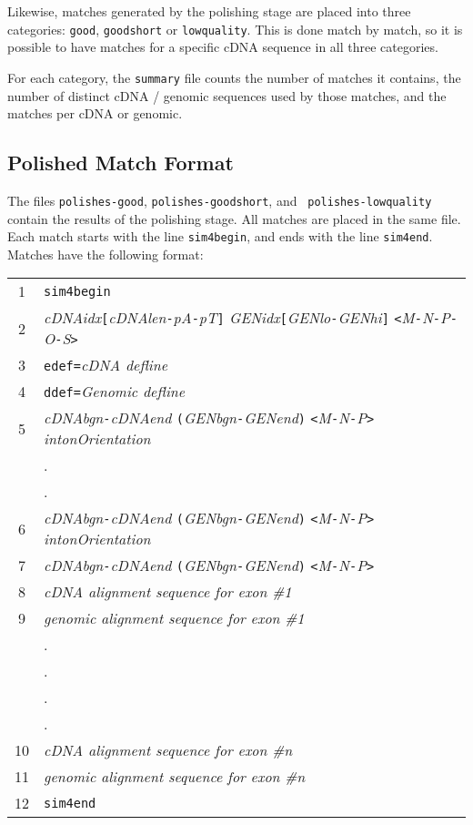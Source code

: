 \documentclass[twoside,11pt]{book}
\begin{document}
Likewise, matches generated by the polishing stage are placed into
three categories: {\tt good}, {\tt goodshort} or {\tt lowquality}.
This is done match by match, so it is possible to have matches for a
specific cDNA sequence in all three categories.

For each category, the {\tt summary} file counts the number of matches
it contains, the number of distinct cDNA / genomic sequences used by
those matches, and the matches per cDNA or genomic.

\subsection{Polished Match Format} 
\label{subsec:matchformat}

The files {\tt polishes-good}, {\tt polishes-goodshort}, and {\tt
polishes-lowquality} contain the results of the polishing stage. All
matches are placed in the same file.  Each match starts with the line
{\tt sim4begin}, and ends with the line {\tt sim4end}.  Matches have
the following format:

\begin{tabular}{c|l}
1 & {\tt sim4begin} \\
2 & {\it cDNAidx}{\tt [}{\it cDNAlen}{\tt -}{\it pA}{\tt -}{\it pT}{\tt ]} {\it GENidx}{\tt [}{\it GENlo}{\tt -}{\it GENhi}{\tt ]} {\tt <}{\it M}{\tt -}{\it N}{\tt -}{\it P}{\tt -}{\it O}{\tt -}{\it S}{\tt >} \\
3 & {\tt edef=}{\it cDNA defline} \\
4 & {\tt ddef=}{\it Genomic defline} \\
5 & {\it cDNAbgn}{\tt -}{\it cDNAend} {\tt (}{\it GENbgn}{\tt -}{\it GENend}{\tt )} {\tt <}{\it M}{\tt -}{\it N}{\tt -}{\it P}{\tt >} {\it intonOrientation} \\
  & . \\
  & . \\
6 & {\it cDNAbgn}{\tt -}{\it cDNAend} {\tt (}{\it GENbgn}{\tt -}{\it GENend}{\tt )} {\tt <}{\it M}{\tt -}{\it N}{\tt -}{\it P}{\tt >} {\it intonOrientation} \\
7 & {\it cDNAbgn}{\tt -}{\it cDNAend} {\tt (}{\it GENbgn}{\tt -}{\it GENend}{\tt )} {\tt <}{\it M}{\tt -}{\it N}{\tt -}{\it P}{\tt >} \\
8 & {\it cDNA alignment sequence for exon \#1} \\
9 & {\it genomic alignment sequence for exon \#1} \\
  & . \\
  & . \\
  & . \\
  & . \\
10 & {\it cDNA alignment sequence for exon \#n} \\
11 & {\it genomic alignment sequence for exon \#n} \\
12 & {\tt sim4end}
\end{tabular}
\end{document}
